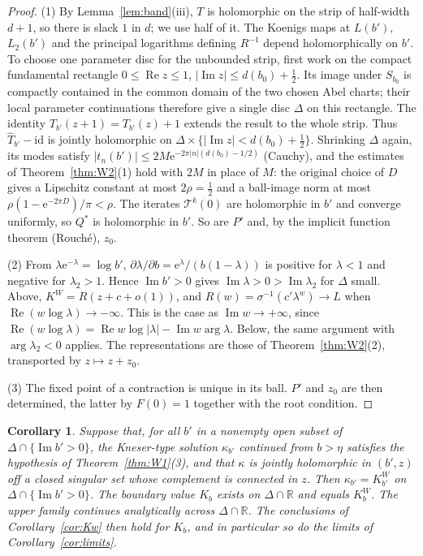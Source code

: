 \documentclass[11pt]{amsart}
\newtheorem{corollary}[theorem]{Corollary}
\theoremstyle{definition}
\newcommand{\Rr}{R}
\newcommand{\Kk}{K}
\newcommand{\eee}{\mathrm{e}}
\begin{document}
\begin{proof}
(1) By Lemma~\ref{lem:band}(iii), $T$ is holomorphic on the strip of half-width $d+1$,
so there is slack $1$ in $d$; we use half of it.  The Koenigs maps at $L(b')$, $L_2(b')$ and the principal logarithms
defining $\Rr^{-1}$ depend holomorphically on $b'$.  To choose one
parameter disc for the unbounded strip, first work on the compact fundamental
rectangle $0\le\operatorname{Re}z\le1$,
$|\operatorname{Im}z|\le d(b_0)+\tfrac12$.  Its image under $S_{b_0}$
is compactly contained in the common domain of the two chosen Abel charts;
their local parameter continuations therefore give a single disc $\Delta$
on this rectangle.  The identity $T_{b'}(z+1)=T_{b'}(z)+1$ extends the
result to the whole strip.  Thus $\hat T_{b'}-\mathrm{id}$ is jointly
holomorphic on $\Delta\times\{|\operatorname{Im}z|<d(b_0)+\tfrac12\}$.
Shrinking $\Delta$ again,
its modes satisfy $|t_n(b')|\le2M\eee^{-2\pi|n|(d(b_0)-1/2)}$ (Cauchy), and the
estimates of Theorem~\ref{thm:W2}(1) hold with $2M$ in place of $M$:
the original choice of $D$ gives a Lipschitz constant at most
$2\rho=\tfrac12$ and a ball-image norm at most
$\rho(1-\eee^{-2\pi D})/\pi<\rho$.  The iterates $\mathcal T^k(0)$ are holomorphic in $b'$
and converge uniformly, so $Q^*$ is holomorphic in $b'$.  So are $P'$ and,
by the implicit function theorem (Rouch\'e), $z_0$.

(2) From $\lambda\eee^{-\lambda}=\log b'$,
$\partial\lambda/\partial b=\eee^{\lambda}/(b(1-\lambda))$ is positive for
$\lambda<1$ and negative for $\lambda_2>1$.  Hence $\operatorname{Im}b'>0$
gives $\operatorname{Im}\lambda>0>\operatorname{Im}\lambda_2$ for $\Delta$
small.  Above, $\Kk^W=\Rr(z+c+o(1))$, and
$\Rr(w)=\sigma^{-1}(c'\lambda^w)\to L$ when
$\operatorname{Re}(w\log\lambda)\to-\infty$.  This is the case as
$\operatorname{Im}w\to+\infty$, since
$\operatorname{Re}(w\log\lambda)=\operatorname{Re}w\log|\lambda|-\operatorname{Im}w\arg\lambda$.
Below, the same argument with $\arg\lambda_2<0$ applies.  The representations
are those of Theorem~\ref{thm:W2}(2), transported by $z\mapsto z+z_0$.

(3) The fixed point of a contraction is unique in its ball.  $P'$ and $z_0$
are then determined, the latter by $F(0)=1$ together with the root
condition.
\end{proof}

\begin{corollary}\label{cor:W1}
Suppose that, for all $b'$ in a nonempty open subset of
$\Delta\cap\{\operatorname{Im}b'>0\}$, the Kneser-type solution $\kappa_{b'}$
continued from $b>\eta$ satisfies the hypothesis of Theorem~\ref{thm:W1}(3), and
that $\kappa$ is jointly holomorphic in $(b',z)$ off a closed singular set whose
complement is connected in $z$.  Then $\kappa_{b'}=\Kk^W_{b'}$ on
$\Delta\cap\{\operatorname{Im}b'>0\}$.  The boundary value $\Kk_b$ exists on
$\Delta\cap\mathbb R$ and equals $\Kk^W_b$.  The upper family continues
analytically across $\Delta\cap\mathbb R$.  The conclusions of
Corollary~\ref{cor:Kw} then hold for $\Kk_b$, and in particular so do
the limits of Corollary~\ref{cor:limits}.
\end{corollary}
\end{document}
